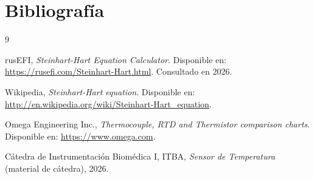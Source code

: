 \section{Bibliografía}

\begin{thebibliography}{9}

rusEFI,
\textit{Steinhart-Hart Equation Calculator}.
Disponible en: \url{https://rusefi.com/Steinhart-Hart.html}.
Consultado en 2026.

Wikipedia,
\textit{Steinhart-Hart equation}.
Disponible en: \url{http://en.wikipedia.org/wiki/Steinhart-Hart_equation}.

Omega Engineering Inc.,
\textit{Thermocouple, RTD and Thermistor comparison charts}.
Disponible en: \url{https://www.omega.com}.

C\'atedra de Instrumentaci\'on Biom\'edica I, ITBA,
\textit{Sensor de Temperatura} (material de c\'atedra), 2026.

\end{thebibliography}